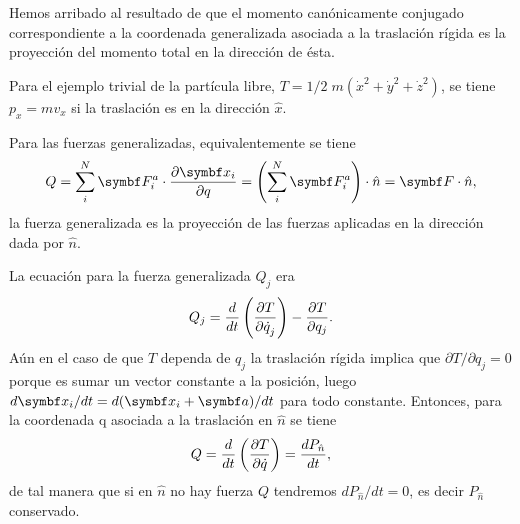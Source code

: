 \documentclass[10pt,oneside]{CBFT_book}
\begin{document}
Hemos arribado al resultado de que el momento canónicamente conjugado correspondiente a la coordenada
generalizada asociada a la traslación rígida es la proyección del momento total en la dirección de ésta.

Para el ejemplo trivial de la partícula libre, $T = 1/2 \; m (\dot{x}^2+ \dot{y}^2+\dot{z}^2)$, se
tiene $ p_x = m v_x $ si la traslación es en la dirección $ \hat{x} $.

Para las fuerzas generalizadas, equivalentemente se tiene 
\[
	Q = \sum_i^N \vb{F}^a_i \cdot \dpar{\vb{x}_i}{q} =
	\left( \sum_i^N \vb{F}^a_i \right) \cdot \hat{n} = \vb{F}\cdot \hat{n},
\]
la fuerza generalizada es la proyección de las fuerzas aplicadas en la dirección dada por $ \hat{n} $.

La ecuación para la fuerza generalizada $Q_j$ era
\[
	Q_j = \frac{d}{dt}\left( \frac{\partial^{\hspace{-0.05em}} {T}}{\partial {\dot{q}_j}^{\hspace{-0.05em}}} \right) - \frac{\partial^{\hspace{-0.05em}} {T}}{\partial {q_j}^{\hspace{-0.05em}}}.
\]
Aún en el caso de que $T$ dependa de $q_j$ la traslación rígida implica que 
$ \partial{T}/\partial{q_j} = 0 $ 
porque es sumar un vector constante a la posición, luego $ d\vb{x}_i/dt = d(\vb{x}_i + \vb{a}) /dt$
para todo  constante. Entonces, para la coordenada q asociada a la traslación en $\hat{n}$
se tiene 
\[
	Q = \frac{d}{dt}\left( \frac{\partial^{\hspace{-0.05em}} {T}}{\partial {\dot{q}}^{\hspace{-0.05em}}} \right) = \frac{d^{\hspace{-0.05em}} {P_{\hat{n}}}}{d {t}^{\hspace{-0.05em}}},
\]
de tal manera que si en $\hat{n}$ no hay fuerza $Q$ tendremos $ d P_{\hat{n}}/dt = 0 $, es decir 
$ P_{\hat{n}} $ conservado.



\end{document}
